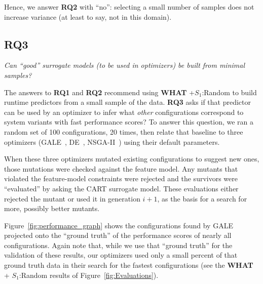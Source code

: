 \documentclass{sig-alternative}
\newcommand{\fig}[1]{Figure~\ref{fig:#1}}
\newcommand{\what}{{\bf WHAT }}
\begin{document}
\begin{myshadowbox}
Hence, we answer {\bf RQ2} with ``no'': selecting a small number of samples does not increase variance (at least to say, not in this domain).
\end{myshadowbox}




\newpage
\subsection{RQ3}

 {\em
Can ``good'' surrogate models (to be used in optimizers)
be built from minimal samples?}

The answers to {\bf RQ1} and {\bf RQ2} recommend using \what+$S_1$:Random to build runtime predictors from a small sample of the data. {\bf RQ3}
asks if that predictor can be used by an optimizer to infer what {\em other} configurations correspond to system variants with fast performance scores?
To answer this question,  we ran  a random set of 100 
configurations, 20 times, then relate that baseline to three optimizers (GALE~\cite{krall2014gale}, DE~\cite{storn1997differential}, NSGA-II~\cite{deb00afast}) using their
default parameters.
 
When these three optimizers mutated existing configurations to suggest new ones,
those mutations were checked against the feature model. Any mutants that violated the feature-model constraints were rejected
and the survivors were ``evaluated'' by asking the CART surrogate model.
These evaluations either rejected the mutant or used it in generation $i+1$, as the basis for a search for more, possibly
better  mutants.




\fig{performance_graph} shows the configurations found by GALE projected onto the ``ground truth'' of the performance scores of nearly
all configurations. Again note that, while we use that ``ground truth'' for the validation of these results, our optimizers 
used only a small percent of that ground truth data in their search for the fastest configurations (see the \what + $S_1$:Random
results of \fig{Evaluations}).
\end{document}
